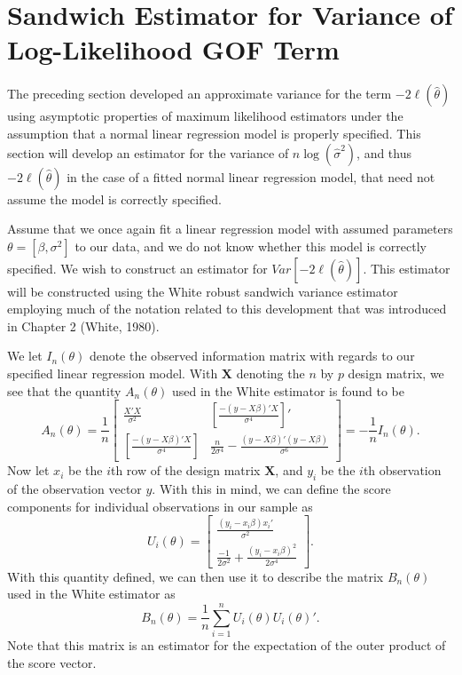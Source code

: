 		\section{Sandwich Estimator for Variance of Log-Likelihood GOF Term} \label{sec:sand_var}

		The preceding section developed an approximate variance for the term $-2 \ell (\hat{\theta})$ using asymptotic properties of maximum likelihood estimators under the assumption
		that a normal linear regression model is properly specified. This section will develop an estimator for the variance of $n\log(\hat{\sigma}^2)$, and thus $-2 \ell (\hat{\theta})$ in
		the case of a fitted normal linear regression model, that need not assume the model is correctly specified.

		Assume that we once again fit a linear regression model with assumed parameters $\theta = [\beta, \sigma^2]$ to our data, and we do not know whether this model is correctly specified.
		We wish to construct an estimator for $Var \left[ -2 \ell (\hat{\theta}  ) \right]$. This estimator will be constructed using the White robust sandwich variance estimator employing
		much of the notation related to this development that was introduced in Chapter 2 (White, 1980).

		We let $I_{n} (\theta)$ denote the observed information matrix with regards to our specified linear regression model. With $\mathbf{X}$ denoting the $n$ by $p$ design matrix, we see that
		the quantity $A_n (\theta)$ used in the White estimator is found to be 
		\begin{equation}
			A_n(\theta) = \frac{1}{n}
			\begin{bmatrix}
				\frac{X'X}{\sigma^2} & \left[ \frac{-(y-X\beta)'X}{\sigma^4} \right]' \\
				\left[ \frac{-(y-X\beta)'X}{\sigma^4} \right] &  \frac{n}{2 \sigma^4} - \frac{(y-X\beta)'(y-X\beta)}{\sigma^6}
				\end{bmatrix}
				= -\frac{1}{n} I_n(\theta) .
		\end{equation}
		Now let $x_i$ be the $i$th row of the design matrix $\mathbf{X}$, and $y_i$ be the $i$th observation of the observation vector $y$. With this in mind, we can define the score components
		for individual observations in our sample as
		\begin{equation}
			U_i(\theta) = 
			\begin{bmatrix}
				\frac{(y_i-x_i \beta)x_i'}{\sigma^2} \\
				\frac{-1}{2 \sigma^2} + \frac{(y_i - x_i \beta)^2}{2 \sigma^4}
			\end{bmatrix}
			.
		\end{equation}
		With this quantity defined, we can then use it to describe the matrix $B_n (\theta)$ used in the White estimator as
		\begin{equation}
			B_n(\theta) = \frac{1}{n} \sum_{i=1}^{n} U_i(\theta) U_i(\theta)' .
		\end{equation}
		Note that this matrix is an estimator for the expectation of the outer product of the score vector.

